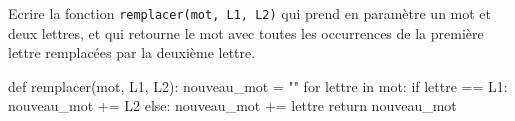 \documentclass[11pt, a4paper]{report}
\begin{document}
\begin{minipage}{0.45\linewidth}
           \begin{exercice_cours}

Ecrire la fonction \verb|remplacer(mot, L1, L2)| qui prend en paramètre un mot et deux lettres, et qui retourne le mot avec toutes les occurrences de la première lettre remplacées par la deuxième lettre.
    \end{exercice_cours}

    \end{minipage}\hfill
    \begin{minipage}{0.53\linewidth}
\begin{blocvisible}[height=5]
    \begin{CodePythontexAlt}[TaillePolice=\large, Largeur=1\linewidth,Centre,Lignes=true,PremLigne=1]{}
def remplacer(mot, L1, L2):
    nouveau_mot = ""
    for lettre in mot:
        if lettre == L1:
            nouveau_mot += L2
        else:
            nouveau_mot += lettre
    return nouveau_mot
    \end{CodePythontexAlt}
\end{blocvisible}

    \end{minipage}
\end{document}
